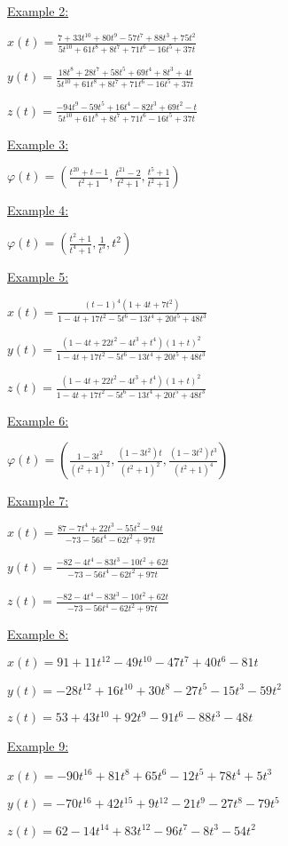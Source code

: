 \documentclass{elsart}
\begin{document}
\underline{Example 2:}

$x(t)=\displaystyle{\frac{7+33t^{10}+80t^9-57t^7+88t^3+75t^2}{5t^{10}+61t^8+8t^7+71t^6-16t^5+37t}}$

$y(t)=\displaystyle{\frac{18t^8+28t^7+58t^5+69t^4+8t^3+4t}{5t^{10}+61t^8+8t^7+71t^6-16t^5+37t}}$

$z(t)=\displaystyle{\frac{-94t^9-59t^5+16t^4-82t^3+69t^2-t}{5t^{10}+61t^8+8t^7+71t^6-16t^5+37t}}$

\underline{Example 3:}


$\varphi(t)=\left(\displaystyle{\frac{t^{20}+t-1}{t^2+1}},\displaystyle{\frac{t^{21}-2}{t^2+1}},\displaystyle{\frac{t^5+1}{t^2+1}}\right)$


\underline{Example 4:}

$\varphi(t)=\left(\displaystyle{\frac{t^2+1}{t^4+1}},\displaystyle{\frac{1}{t^3}},t^2
\right)$


\underline{Example 5:}

$x(t)=\displaystyle{\frac{(t-1)^4(1+4t+7t^2)}{1-4t+17t^2-5t^6-13t^4+20t^5+48t^3}}$

$y(t)=\displaystyle{\frac{(1-4t+22t^2-4t^3+t^4)(1+t)^2}{1-4t+17t^2-5t^6-13t^4+20t^5+48t^3}}$

$z(t)=\displaystyle{\frac{(1-4t+22t^2-4t^3+t^4)(1+t)^2}{1-4t+17t^2-5t^6-13t^4+20t^5+48t^3}}$

\underline{Example 6:}

$\varphi(t)=\left(\displaystyle{\frac{1-3t^2}{(t^2+1)^2}},\displaystyle{\frac{(1-3t^2)t}{(t^2+1)^2}},\displaystyle{\frac{(1-3t^2)t^3}{(t^2+1)^4}}\right)$

\underline{Example 7:}

$x(t)=\displaystyle{\frac{87-7t^4+22t^3-55t^2-94t}{-73-56t^4-62t^2+97t}}$

$y(t)=\displaystyle{\frac{-82-4t^4-83t^3-10t^2+62t}{-73-56t^4-62t^2+97t}}$

$z(t)=\displaystyle{\frac{-82-4t^4-83t^3-10t^2+62t}{-73-56t^4-62t^2+97t}}$

\underline{Example 8:}

$x(t)=91+11t^{12}-49t^{10}-47t^7+40t^6-81t$

$y(t)=-28t^{12}+16t^{10}+30t^8-27t^5-15t^3-59t^2$

$z(t)=53+43t^{10}+92t^9-91t^6-88t^3-48t$

\underline{Example 9:}

$x(t)=-90t^{16}+81t^8+65t^6-12t^5+78t^4+5t^3$

$y(t)=-70t^{16}+42t^{15}+9t^{12}-21t^9-27t^8-79t^5$

$z(t)=62-14t^{14}+83t^{12}-96t^7-8t^3-54t^2$
\end{document}
